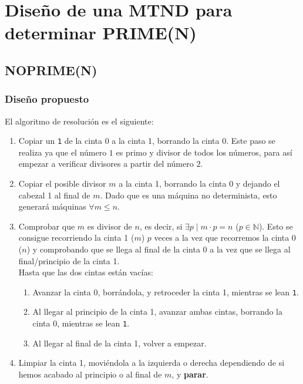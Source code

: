 \section{Diseño de una MTND para determinar PRIME(N)}


\subsection{NOPRIME(N)} \label{MT-7A}

\subsubsection*{Diseño propuesto}
El algoritmo de resolución es el siguiente:

\begin{enumerate}
    \item Copiar un \texttt{1} de la cinta 0 a la cinta 1, borrando la cinta 0. Este paso se realiza ya que el número $1$ es primo y divisor de todos los números, para así empezar a verificar divisores a partir del número $2$.
    \item Copiar el posible divisor $m$ a la cinta 1, borrando la cinta 0 y dejando el cabezal 1 al final de $m$. Dado que es una máquina no determinista, esto generará máquinas $\forall m \leq n$.
    \item Comprobar que $m$ es divisor de $n$, es decir, si $\exists p \mid m\cdot p = n$ ($p \in \mathbb{N}$). Esto se consigue recorriendo la cinta 1 ($m$) $p$ veces a la vez que recorremos la cinta 0 ($n$) y comprobando que se llega al final de la cinta 0 a la vez que se llega al final/principio de la cinta 1.\\
    Hasta que las dos cintas están vacías:
    \begin{enumerate}[1.]
        \item Avanzar la cinta 0, borrándola, y retroceder la cinta 1, mientras se lean \texttt{1}.
        \item Al llegar al principio de la cinta 1, avanzar ambas cintas, borrando la cinta 0, mientras se lean \texttt{1}.
        \item Al llegar al final de la cinta 1, volver a empezar.
    \end{enumerate}
    \item Limpiar la cinta 1, moviéndola a la izquierda o derecha dependiendo de si hemos acabado al principio o al final de $m$, y \textbf{parar}.
\end{enumerate}

